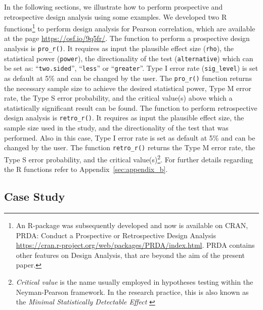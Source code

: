 \documentclass{article}\usepackage[]{graphicx}\usepackage[]{color}
\begin{document}
In the following sections, we illustrate how to perform prospective and retrospective design analysis using some examples. We developed two R functions\footnote{An R-package was subsequently developed and now is available on CRAN, PRDA: Conduct a Prospective or Retrospective Design Analysis \url{https://cran.r-project.org/web/packages/PRDA/index.html}. PRDA contains  other features on Design Analysis,  that are beyond the aim of the present paper.} to perform design analysis for Pearson correlation, which are available at the page \url{https://osf.io/9q5fr/}. The function to perform a prospective design analysis is \texttt{pro\_r()}. It requires as input the plausible effect size (\texttt{rho}), the statistical power (\texttt{power}), the directionality of the test (\texttt{alternative}) which can be set as: “\texttt{two.sided}”, “\texttt{less}” or “\texttt{greater}”. Type I error rate (\texttt{sig\_level}) is set as default at 5\% and can be changed by the user. The \texttt{pro\_r()} function returns the necessary sample size to achieve the desired statistical power, Type M error rate, the Type S error probability, and the critical value(s) above which a statistically significant result can be found. The function to perform retrospective design analysis is \texttt{retro\_r()}. It requires as input the plausible effect size, the sample size used in the study, and the directionality of the test that was performed. Also in this case, Type I error rate is set as default at 5\% and can be changed by the user.  The function \texttt{retro\_r()} returns the Type M error rate, the Type S error probability, and the critical value(s)\footnote{\emph{Critical value} is the name usually employed in hypotheses testing within the Neyman-Pearson framework. In the research practice, this is also known as the \emph{Minimal Statistically Detectable Effect} \parencite{cookAssessingMethodsSpecify2014, phillipsStatisticalSignificanceSediment2001}}. For further details regarding the R functions refer to Appendix~\ref{sec:appendix_b}.


\subsection{Case Study}
\end{document}
